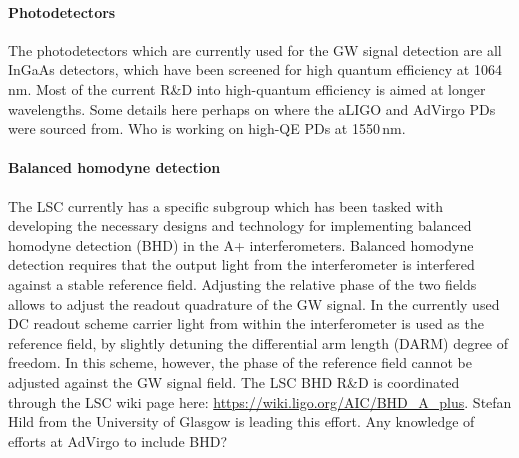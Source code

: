 \paragraph{Photodetectors}
The photodetectors which are currently used for the GW signal detection are all InGaAs detectors, which have been screened for high quantum efficiency at 1064\,nm. Most of the current R\&D into high-quantum efficiency is aimed at longer wavelengths. Some details here perhaps on where the aLIGO and AdVirgo PDs were sourced from. Who is working on high-QE PDs at 1550\,nm.

\paragraph{Balanced homodyne detection}
The LSC currently has a specific subgroup which has been tasked with developing the necessary designs and technology for implementing balanced homodyne detection (BHD) in the A+ interferometers. Balanced homodyne detection requires that the output light from the interferometer is interfered against a stable reference field. Adjusting the relative phase of the two fields allows to adjust the readout quadrature of the GW signal. In the currently used DC readout scheme carrier light from within the interferometer is used as the reference field, by slightly detuning the differential arm length (DARM) degree of freedom. In this scheme, however, the phase of the reference field cannot be adjusted against the GW signal field. The LSC BHD R\&D is coordinated through the LSC wiki page here: \url{https://wiki.ligo.org/AIC/BHD_A_plus}. Stefan Hild from the University of Glasgow is leading this effort. Any knowledge of efforts at AdVirgo to include BHD?

